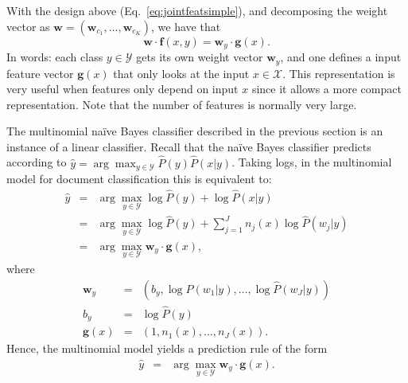 \begin{remark}
With the design above (Eq.~\ref{eq:jointfeatsimple}), and 
decomposing the weight vector as 
$\boldsymbol{w} = (\boldsymbol{w}_{c_1},\ldots,\boldsymbol{w}_{c_K})$, we 
have that 
\begin{equation}
\boldsymbol{w} \cdot \boldsymbol{f}(x,y) = \boldsymbol{w}_y \cdot \boldsymbol{g}(x).
\end{equation}
In words: each class $y \in \mathcal{Y}$ gets its own weight vector $\boldsymbol{w}_y$, 
and one defines a input feature vector $\boldsymbol{g}(x)$ that only
looks at the input $x \in \mathcal{X}$. This representation is very
useful when features only depend on input $x$ since it allows a more
compact representation. Note that the number of features is normally
very large.
\end{remark}






\begin{remark}
The multinomial na\"ive Bayes classifier described in the previous section is an instance of a linear classifier.
Recall that the na\"ive Bayes classifier predicts according to ${\hat y} = \arg\max_{y \in \mathcal{Y}} \hat{P}(y) \hat{P}(x|y)$. 
Taking logs, in the multinomial model for document classification this is equivalent to: 
\begin{eqnarray}
{\hat y} &=& \arg\max_{y \in \mathcal{Y}} \log \hat{P}(y) + \log \hat{P}(x|y) \nonumber\\
&=& \arg\max_{y \in \mathcal{Y}} \log \hat{P}(y) + \sum_{j=1}^J n_j(x) \log \hat{P}(w_{j}|y)\nonumber\\
&=& \arg\max_{y \in \mathcal{Y}} \boldsymbol{w}_y \cdot \boldsymbol{g}(x), 
\end{eqnarray}
where
\begin{eqnarray}
\boldsymbol{w}_y &=& \left(b_y, \log \hat{P}(w_1 | y),\ldots, \log \hat{P}(w_J | y)\right) \nonumber\\
b_y &=& \log \hat{P}(y)\nonumber\\
\boldsymbol{g}(x) &=& (1, n_1(x), \ldots, n_J(x)).
\end{eqnarray}
Hence, the multinomial model yields a prediction rule of the form
\begin{eqnarray}
{\hat y} &=& \arg\max_{y \in \mathcal{Y}} \boldsymbol{w}_y \cdot \boldsymbol{g}(x). 
\end{eqnarray}
\end{remark}

%

